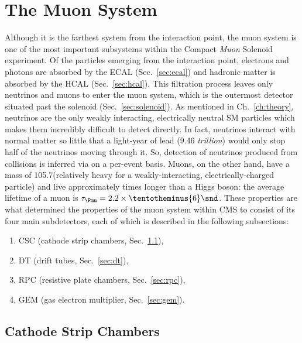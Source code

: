 \section{The Muon System}
\label{sec:muon_sys}
Although it is the farthest system from the interaction point, the muon system is one of the most important subsystems within the Compact \emph{Muon} Solenoid experiment.
Of the particles emerging from the interaction point, electrons and photons are absorbed by the ECAL (Sec.~\ref{sec:ecal}) and hadronic matter is absorbed by the HCAL (Sec.~\ref{sec:hcal}).
This filtration process leaves only neutrinos and muons to enter the muon system, which is the outermost detector situated past the solenoid (Sec.~\ref{sec:solenoid}).
As mentioned in Ch.~\ref{ch:theory}, neutrinos are the only weakly interacting, electrically neutral SM particles which makes them incredibly difficult to detect directly.
In fact, neutrinos interact with normal matter so little that a light-year of lead (9.46 \emph{trillion}\Km) would only stop half of the neutrinos moving through it.
So, detection of neutrinos produced from \pp collisions is inferred via \MET on a per-event basis.
Muons, on the other hand, have a mass of 105.7\MeV (relatively heavy for a weakly-interacting, electrically-charged particle) and live approximately  times longer than a Higgs boson: the average lifetime of a muon is $\tau_{\Pmu} = 2.2 \times \tentotheminus{6}\snd$.
These properties are what determined the properties of the muon system within CMS to consist of its four main subdetectors, each of which is described in the following subsections:
\begin{enumerate}
    \item CSC (cathode strip chambers, Sec.~\ref{sec:csc}),
    \item DT (drift tubes, Sec.~\ref{sec:dt}),
    \item RPC (resistive plate chambers, Sec.~\ref{sec:rpc}),
    \item GEM (gas electron multiplier, Sec.~\ref{sec:gem}).
\end{enumerate}

\subsection{Cathode Strip Chambers}
\label{sec:csc} 

